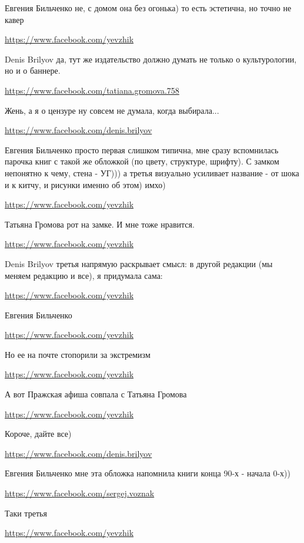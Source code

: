 \documentclass[a4paper,11pt]{extreport}
\begin{document}
\begin{itemize}
\begin{itemize}
Евгения Бильченко не, с домом она без огонька) то есть эстетична, но точно не кавер

\url{https://www.facebook.com/yevzhik}

Denis Brilyov да, тут же издательство должно думать не только о культурологии, но и о баннере.

\url{https://www.facebook.com/tatiana.gromova.758}

Жень, а я о цензуре ну совсем не думала, когда выбирала...

\url{https://www.facebook.com/denis.brilyov}

Евгения Бильченко просто первая слишком типична, мне сразу вспомнилась парочка книг с такой же обложкой (по цвету, структуре, шрифту). С замком непонятно к чему, стена - УГ))) а третья визуально усиливает название - от шока и к китчу, и рисунки именно об этом) имхо)

\url{https://www.facebook.com/yevzhik}

Татьяна Громова рот на замке. И мне тоже нравится.

\url{https://www.facebook.com/yevzhik}

Denis Brilyov третья напрямую раскрывает смысл: в другой редакции (мы меняем редакцию и все), я придумала сама:

\url{https://www.facebook.com/yevzhik}

Евгения Бильченко

\url{https://www.facebook.com/yevzhik}

Но ее на почте стопорили за экстремизм

\url{https://www.facebook.com/yevzhik}

А вот Пражская афиша совпала с Татьяна Громова

\url{https://www.facebook.com/yevzhik}

Короче, дайте все)

\url{https://www.facebook.com/denis.brilyov}

Евгения Бильченко мне эта обложка напомнила книги конца 90-х - начала 0-х))

\end{itemize}
\url{https://www.facebook.com/sergej.voznak}

Таки третья

\begin{itemize}
\url{https://www.facebook.com/yevzhik}


\end{itemize}
\end{itemize}
\end{document}

